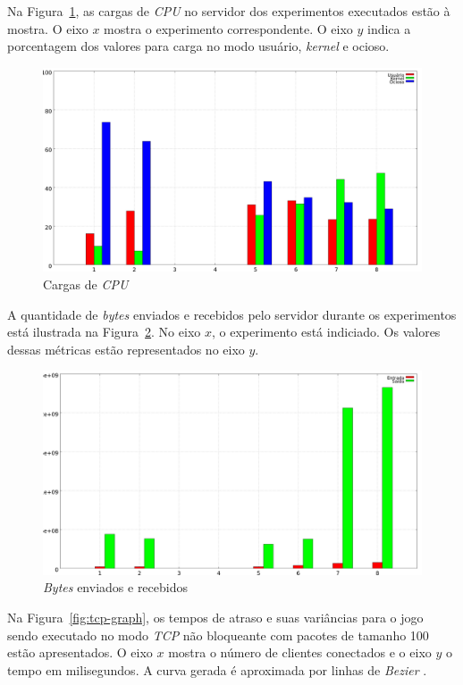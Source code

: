 \documentclass[12pt]{article}
\begin{document}
Na Figura~\ref{fig:cpu-graph}, as cargas de \emph{CPU} no servidor dos experimentos executados estão à mostra. O eixo $x$ mostra o experimento correspondente. O eixo $y$ indica a porcentagem dos valores para carga no modo usuário, \emph{kernel} e ocioso.

\begin{figure}[ht]
  \centering
  \includegraphics[width=1\textwidth]{img/cpu-graph.png}
  \caption{Cargas de \emph{CPU}}
  \label{fig:cpu-graph}
\end{figure}

A quantidade de \emph{bytes} enviados e recebidos pelo servidor durante os experimentos está ilustrada na Figura~\ref{fig:net-graph}. No eixo $x$, o experimento está indiciado. Os valores dessas métricas estão representados no eixo $y$.

\begin{figure}[ht]
  \centering
  \includegraphics[width=1\textwidth]{img/net-graph.png}
  \caption{\emph{Bytes} enviados e recebidos}
  \label{fig:net-graph}
\end{figure}

Na Figura~\ref{fig:tcp-graph}, os tempos de atraso e suas variâncias para o jogo sendo executado no modo \emph{TCP} não bloqueante com pacotes de tamanho 100 estão apresentados. O eixo $x$ mostra o número de clientes conectados e o eixo $y$ o tempo em milisegundos. A curva gerada é aproximada por linhas de \emph{Bezier} \cite{Bezier}.
\end{document}
